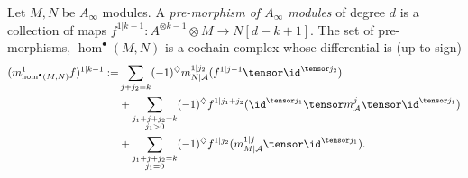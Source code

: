   
Let $M, N$ be $A_\infty$ modules. A  \emph{pre-morphism of $A_\infty$ modules} of degree $d$ is a collection of maps $f^{1|k-1}: A^{\otimes k-1}\otimes M\to N[d-k+1]$. The set of pre-morphisms, $\hom^\bullet(M, N)$ is a cochain complex whose differential is (up to sign)
\begin{align*}
    (m^1_{\hom^\bullet(M, N)} f)^{1|k-1}:=&\sum_{j+j_2=k}(-1)^\diamondsuit m^{1|j_2}_{N|\mathcal A} (f^{1|j-1}\tensor \id^{\tensor j_2})\\&+
    \sum_{\substack{j_1+j+j_2=k\\j_1>0}} (-1)^\diamondsuit f^{1|j_1+j_2}(\id^{\tensor j_1}\tensor m^j_{\mathcal A}\tensor \id^{\tensor j_1})\\
    &+
    \sum_{\substack{j_1+j+j_2=k\\j_1=0}} (-1)^\diamondsuit f^{1|j_2}(m^{1|j}_{M|\mathcal A}\tensor \id^{\tensor j_1}).
\end{align*}

 